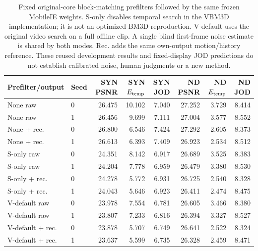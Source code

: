 \begin{table}[t]
\centering\scriptsize\setlength{\tabcolsep}{4pt}
\caption{Fixed original-core block-matching prefilters followed by the same frozen MobileIE weights. S-only disables temporal search in the VBM3D implementation; it is not an optimized BM3D reproduction. V-default uses the original video search on a full offline clip. A single blind first-frame noise estimate is shared by both modes. Rec. adds the same own-output motion/history reference. These reused development results and fixed-display JOD predictions do not establish calibrated noise, human judgments or a new method.}
\label{tab:classical-block}
\begin{tabular}{llrrrrrr}
\toprule
Prefilter/output & Seed & SYN PSNR & SYN $E_{\rm temp}$ & SYN JOD & ND PSNR & ND $E_{\rm temp}$ & ND JOD\\
\midrule
None raw & 0 & 26.475 & 10.102 & 7.040 & 27.252 & 3.729 & 8.414\\
None raw & 1 & 26.456 & 9.699 & 7.111 & 27.004 & 3.577 & 8.552\\
None + rec. & 0 & 26.800 & 6.546 & 7.424 & 27.292 & 2.605 & 8.373\\
None + rec. & 1 & 26.613 & 6.393 & 7.409 & 26.923 & 2.534 & 8.512\\
S-only raw & 0 & 24.351 & 8.142 & 6.917 & 26.689 & 3.525 & 8.383\\
S-only raw & 1 & 24.204 & 7.778 & 6.959 & 26.479 & 3.380 & 8.530\\
S-only + rec. & 0 & 24.278 & 5.772 & 6.931 & 26.725 & 2.540 & 8.328\\
S-only + rec. & 1 & 24.043 & 5.646 & 6.923 & 26.411 & 2.474 & 8.475\\
V-default raw & 0 & 23.978 & 7.554 & 6.781 & 26.605 & 3.466 & 8.380\\
V-default raw & 1 & 23.807 & 7.233 & 6.816 & 26.394 & 3.327 & 8.527\\
V-default + rec. & 0 & 23.878 & 5.707 & 6.749 & 26.641 & 2.522 & 8.324\\
V-default + rec. & 1 & 23.637 & 5.599 & 6.735 & 26.328 & 2.459 & 8.471\\
\bottomrule
\end{tabular}
\end{table}
